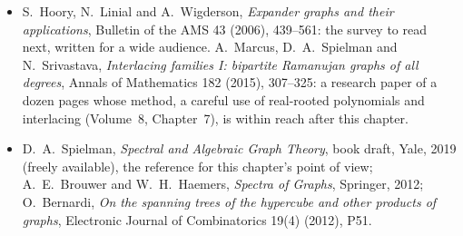 \begin{itemize}
{of linear sized tolerant networks}, Discrete Mathematics 72 (1988), 15--19; A.~Lubotzky, R.~Phillips and P.~Sarnak, \emph{Ramanujan graphs}, Combinatorica 8 (1988), 261--277; J.~Friedman,
\emph{A proof of Alon's second eigenvalue conjecture and related problems}, Memoirs of the AMS 195 (2008).
\item S.~Hoory, N.~Linial and A.~Wigderson, \emph{Expander graphs and their applications}, Bulletin of the AMS 43 (2006), 439--561: the survey to read next, written for a wide audience. A.~Marcus, D.~A.~Spielman
and N.~Srivastava, \emph{Interlacing families I: bipartite Ramanujan graphs of all degrees}, Annals of Mathematics 182 (2015), 307--325: a research paper of a dozen pages whose method, a careful use of
real-rooted polynomials and interlacing (Volume~8, Chapter~7), is within reach after this chapter.
\item D.~A.~Spielman, \emph{Spectral and Algebraic Graph Theory}, book draft, Yale, 2019 (freely available), the reference for this chapter's point of view; A.~E.~Brouwer and W.~H.~Haemers,
\emph{Spectra of Graphs}, Springer, 2012; O.~Bernardi, \emph{On the spanning trees of the hypercube and other products of graphs}, Electronic Journal of Combinatorics 19(4) (2012), P51.
\end{itemize}

